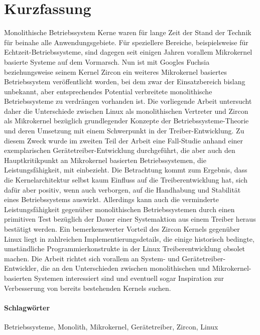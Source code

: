 
\section*{Kurzfassung}
Monolithische Betriebssystem Kerne waren für lange Zeit der Stand der Technik für beinahe alle Anwendungsgebiete.
Für speziellere Bereiche, beispielsweise für Echtzeit-Betriebssysteme, sind dagegen seit einigen Jahren vorallem Mikrokernel basierte Systeme auf dem Vormarsch.
Nun ist mit Googles Fuchsia beziehungsweise seinem Kernel Zircon ein weiteres Mikrokernel basiertes Betriebssystem veröffentlicht worden, bei dem zwar der Einsatzbereich bislang unbekannt, aber entsprechendes Potential verbreitete monolithische Betriebssysteme zu verdrängen vorhanden ist.
Die vorliegende Arbeit untersucht daher die Unterschiede zwischen Linux als monolithischen Vertreter und Zircon als Mikrokernel bezüglich grundlegender Konzepte der Betriebssysteme-Theorie und deren Umsetzung mit einem Schwerpunkt in der Treiber-Entwicklung.
Zu diesem Zweck wurde im zweiten Teil der Arbeit eine Fall-Studie anhand einer exemplarischen Gerätetreiber-Entwicklung durchgeführt, die aber auch den Hauptkritikpunkt an Mikrokernel basierten Betriebssystemen, die Leistungsfähigkeit, mit einbezieht.
Die Betrachtung kommt zum Ergebnis, dass die Kernelarchitektur selbst kaum Einfluss auf die Treiberentwicklung hat, sich dafür aber positiv, wenn auch verborgen, auf die Handhabung und Stabilität eines Betriebssystems auswirkt.
Allerdings kann auch die verminderte Leistungsfähigkeit gegenüber monolithischen Betriebssystemen durch einen primitiven Test bezüglich der Dauer einer Systemaktion aus einem Treiber heraus bestätigt werden.
Ein bemerkenswerter Vorteil des Zircon Kernels gegenüber Linux liegt in zahlreichen Implementierungsdetails, die einige historisch bedingte, umständliche Programmierkonstrukte in der Linux Treiberentwicklung obsolet machen.
Die Arbeit richtet sich vorallem an System- und Gerätetreiber-Entwickler, die an den Unterschieden zwischen monolithischen und Mikrokernel-basierten Systemen interessiert sind und eventuell sogar Inspiration zur Verbesserung von bereits bestehenden Kernels suchen.

\paragraph{Schlagwörter} Betriebssysteme, Monolith, Mikrokernel, Gerätetreiber, Zircon, Linux 

\newpage
